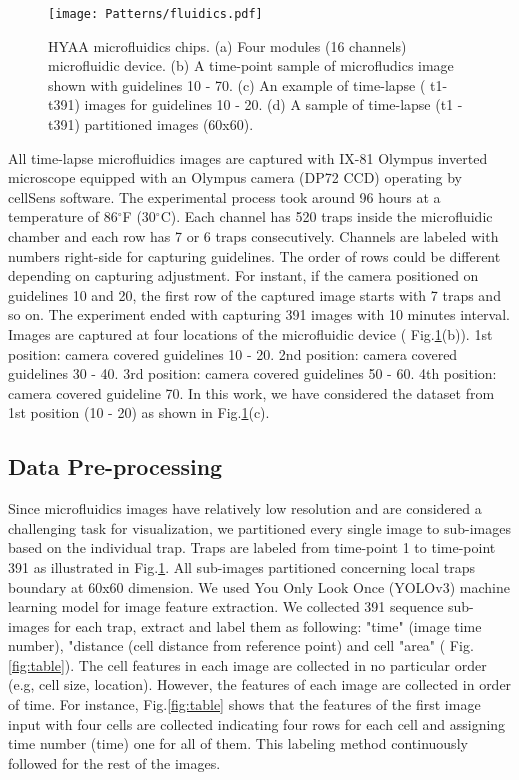 \documentclass[conference]{IEEEtran}
\begin{document}
\begin{figure}
\centering
\texttt{[image: Patterns/fluidics.pdf]}
\caption{ HYAA microfluidics chips. (a) Four modules (16 channels) microfluidic device. (b) A time-point sample of microfludics image shown with guidelines 10 - 70. (c) An example of time-lapse ( t1-t391) images for guidelines 10 - 20. (d) A sample of time-lapse (t1 - t391) partitioned images (60x60).}
\label{fig:micro}
\end{figure}

All time-lapse microfluidics images are captured with IX-81 Olympus inverted microscope equipped with an Olympus camera (DP72 CCD) operating by cellSens software. The experimental process took around 96 hours at a temperature of 86$^{\circ}$F (30$^{\circ}$C). Each channel has 520 traps inside the microfluidic chamber and each row has 7 or 6 traps consecutively. Channels are labeled with numbers right-side for capturing guidelines. The order of rows could be different depending on capturing adjustment. For instant, if the camera positioned on guidelines 10 and 20, the first row of the captured image starts with 7 traps and so on. The experiment ended with capturing 391 images with 10 minutes interval. Images are captured at four locations of the microfluidic device ( Fig.\ref{fig:micro}(b)). 1st position: camera covered guidelines 10 - 20. 2nd position: camera covered guidelines 30 - 40. 3rd position: camera covered guidelines 50 - 60. 4th position: camera covered guideline 70. In this work, we have considered the dataset from 1st position (10 - 20) as shown in Fig.\ref{fig:micro}(c).


\subsection{Data Pre-processing}
Since microfluidics images have relatively low resolution and are considered a challenging task for visualization, we partitioned every single image to sub-images based on the individual trap. Traps are labeled from time-point 1 to time-point 391 as illustrated in Fig.\ref{fig:micro}. All sub-images partitioned concerning local traps boundary at 60x60 dimension. We used You Only Look Once (YOLOv3) \cite{ref20} machine learning model for image feature extraction. We collected 391 sequence sub-images for each trap, extract and label them as following:  "time" (image time number), "distance (cell distance from reference point) and cell "area" ( Fig.\ref{fig:table}). The cell features in each image are collected in no particular order (e.g, cell size, location). However, the features of each image are collected in order of time. For instance, Fig.\ref{fig:table} shows that the features of the first image input with four cells are collected indicating four rows for each cell and assigning time number (time) one for all of them. This labeling method continuously followed for the rest of the images.
\end{document}
